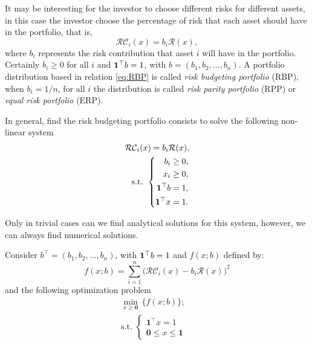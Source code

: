 It may be interesting for the investor to choose different risks for different assets, in this case the investor choose the percentage of risk that each asset should have in the portfolio, that is,
\begin{equation}\label{eq:RBP}
	\mathcal{RC}_i(x)=b_i\mathcal{R}(x),
\end{equation}
where $b_i$ represents the risk contribution that asset $i$ will have in the portfolio. Certainly $b_i\geq 0$ for all $i$ and
${\bf 1}^\top b =1$, with $b=(b_1, b_2, \dots, b_n)$. A portfolio distribution based in relation \eqref{eq:RBP} is called \textit{risk budgeting portfolio} (RBP), when $b_i=1/n$, for all $i$ the distribution is called \textit{risk parity portfolio} (RPP) or \textit{equal risk portfolio} (ERP).

In general, find the risk budgeting portfolio consists to solve the following non-linear system
\begin{eqnarray}\label{eq:SisNLin}
\mathcal{RC}_i(x)=b_i\mathcal{R}(x), \\
	\mbox{s.t. }\left\{
	\begin{aligned}\nonumber
b_i \geq 0, \\
x_i \geq 0, \\
{\bf 1}^\top b =1, \\
{\bf 1}^\top x =1.
	\end{aligned}
	\right.
\end{eqnarray}











Only in trivial cases can we find analytical solutions for this system, however, we can always find numerical solutions.

Consider $b^\top = (b_1, b_2, \dots, b_n)$, with ${\bf 1}^\top b =1$ and $f(x;b)$ defined by:
\[
f(x;b) = \sum_{i=1}^n \big(\mathcal{RC}_i(x) -b_i\mathcal{R}(x)\Big)^2
\] and the following optimization problem
\begin{eqnarray}\label{eq:MinProb}
\min_{x\geq \textbf{0}}\, \{f(x;b)\}; \\
	\mbox{s.t. }\left\{
	\begin{aligned}\nonumber
		\mathbf{1}^\top x=1 & \\
		\mathbf{0}\leq x \leq \mathbf{1}
	\end{aligned}
	\right.
\end{eqnarray}

